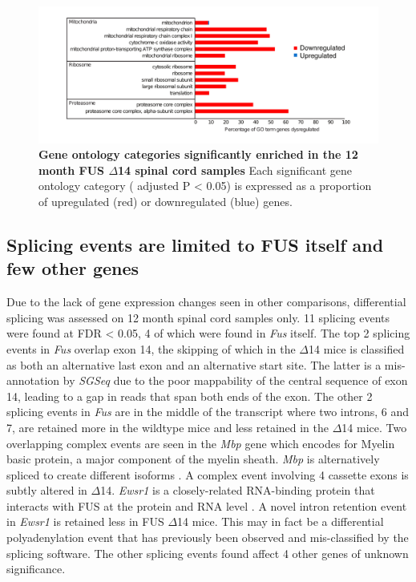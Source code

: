 \begin{figure}[h!]
	\centering
	\includegraphics[width=\textwidth]{Figures/04_fus_mice/anny_GO_terms.png}
	\caption[Gene ontology categories in the 12 month spinal cord samples]{
		\textbf{Gene ontology categories significantly enriched in the 12 month FUS $\Delta$14 spinal cord samples}
		Each significant gene ontology category ( adjusted P < 0.05) is expressed as a proportion of upregulated (red) or downregulated (blue) genes.
	}
		\label{fig:delta14_go}
\end{figure}


\subsection{Splicing events are limited to FUS itself and few other genes}
Due to the lack of gene expression changes seen in other comparisons, differential splicing was assessed on 12 month spinal cord samples only.  
11 splicing events were found at FDR < 0.05, 4 of which were found in \textit{Fus} itself.
The top 2 splicing events in \textit{Fus} overlap exon 14, the skipping of which in the $\Delta$14 mice is classified as both an alternative last exon and an alternative start site.
The latter is a mis-annotation by \textit{SGSeq} due to the poor mappability of the central sequence of exon 14, leading to a gap in reads that span both ends of the exon.
The other 2 splicing events in \textit{Fus} are in the middle of the transcript where two introns, 6 and 7, are retained more in the wildtype mice and less retained in the $\Delta$14 mice.
Two overlapping complex events are seen in the \textit{Mbp} gene which encodes for Myelin basic protein, a major component of the myelin sheath. \textit{Mbp} is alternatively spliced to create different isoforms \citep{DeFerra1985}. A complex event involving 4 cassette exons is subtly altered in $\Delta$14.
\textit{Ewsr1} is a closely-related RNA-binding protein that interacts with FUS at the protein and RNA level \citep{Kapeli2016,Lagier-Tourenne2012}. 
A novel intron retention event in \textit{Ewsr1} is retained less in FUS $\Delta$14 mice.
This may in fact be a differential polyadenylation event that has previously been observed \citep{Rogelj2012} and mis-classified by the splicing software.
The other splicing events found affect 4 other genes of unknown significance.

